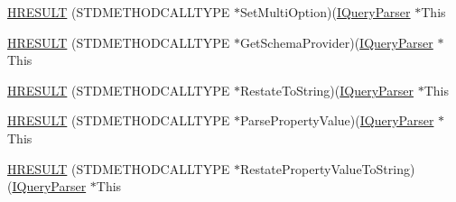 \begin{DoxyCompactItemize}
\item 
\hyperlink{struct_i_query_parser_vtbl_a5f13ced9e83036ba8c967b52e3c80942}{H\+R\+E\+S\+U\+LT} (S\+T\+D\+M\+E\+T\+H\+O\+D\+C\+A\+L\+L\+T\+Y\+PE $\ast$Set\+Multi\+Option)(\hyperlink{structuredquery_8h_ac6bf6a3bb0538d5785821c0c7e2081e5}{I\+Query\+Parser} $\ast$This
\item 
\hyperlink{struct_i_query_parser_vtbl_aa24a17cb10823ce75a5e0c4e8d52e8d3}{H\+R\+E\+S\+U\+LT} (S\+T\+D\+M\+E\+T\+H\+O\+D\+C\+A\+L\+L\+T\+Y\+PE $\ast$Get\+Schema\+Provider)(\hyperlink{structuredquery_8h_ac6bf6a3bb0538d5785821c0c7e2081e5}{I\+Query\+Parser} $\ast$This
\item 
\hyperlink{struct_i_query_parser_vtbl_a56d56585c2e0295f16c96af76fc4e9c0}{H\+R\+E\+S\+U\+LT} (S\+T\+D\+M\+E\+T\+H\+O\+D\+C\+A\+L\+L\+T\+Y\+PE $\ast$Restate\+To\+String)(\hyperlink{structuredquery_8h_ac6bf6a3bb0538d5785821c0c7e2081e5}{I\+Query\+Parser} $\ast$This
\item 
\hyperlink{struct_i_query_parser_vtbl_a697a5389733d0009d8eb21d00960c1ea}{H\+R\+E\+S\+U\+LT} (S\+T\+D\+M\+E\+T\+H\+O\+D\+C\+A\+L\+L\+T\+Y\+PE $\ast$Parse\+Property\+Value)(\hyperlink{structuredquery_8h_ac6bf6a3bb0538d5785821c0c7e2081e5}{I\+Query\+Parser} $\ast$This
\item 
\hyperlink{struct_i_query_parser_vtbl_a15e079c71235224a669b8daa133509ac}{H\+R\+E\+S\+U\+LT} (S\+T\+D\+M\+E\+T\+H\+O\+D\+C\+A\+L\+L\+T\+Y\+PE $\ast$Restate\+Property\+Value\+To\+String)(\hyperlink{structuredquery_8h_ac6bf6a3bb0538d5785821c0c7e2081e5}{I\+Query\+Parser} $\ast$This
\end{DoxyCompactItemize}
